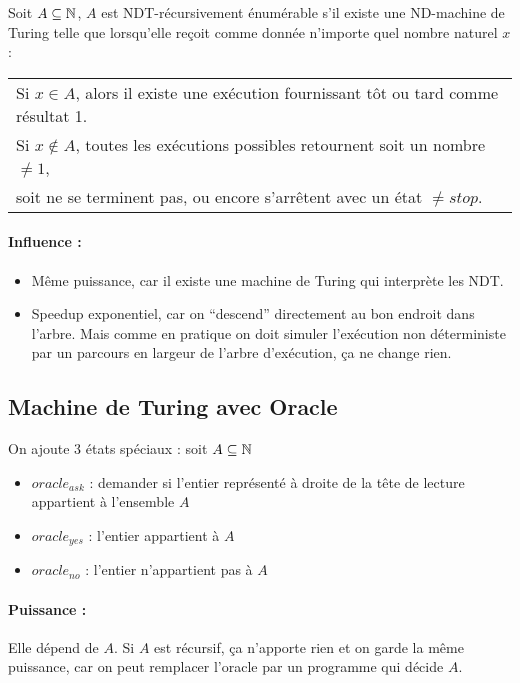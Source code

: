 \begin{mydef} Soit $A\subseteq \mathbb{N}$, $A$ est
	NDT-récursivement énumérable s'il
	existe une ND-machine de Turing telle que lorsqu'elle reçoit comme
	donnée n'importe quel nombre naturel $x$:\\
	\begin{tabular}{l}
		Si $x\in A$, alors il existe une exécution fournissant tôt ou
		tard comme résultat 1.\\
		Si $x\notin A$, toutes les exécutions possibles retournent soit un
		nombre $\neq 1$, \\
		soit ne se terminent pas, ou encore s'arrêtent avec
		un état $\neq stop$.\\
	\end{tabular}
\end{mydef}

\paragraph{Influence :}
\begin{itemize}
	\item Même puissance, car il existe une machine de Turing qui interprète
	 les NDT.
	\item Speedup exponentiel, car on ``descend'' directement au bon endroit
		dans l'arbre. Mais comme en pratique on doit simuler
		l'exécution non déterministe par un parcours en largeur de l'arbre d'exécution,
		 ça ne change rien.
\end{itemize}

\subsection{Machine de Turing avec Oracle}
On ajoute 3 états spéciaux : soit $A \subseteq \mathbb{N}$
\begin{itemize}
	\item $oracle_{ask}$ : demander si l'entier représenté à droite de la
		tête de lecture appartient à l'ensemble $A$
	\item $oracle_{yes}$ : l'entier appartient à $A$
	\item $oracle_{no}$ :  l'entier n'appartient pas à $A$
\end{itemize}

\paragraph{Puissance :} Elle dépend de $A$. Si $A$ est récursif, ça n'apporte rien et
  on garde la même puissance, car on peut remplacer l'oracle par un programme qui décide
  $A$.

